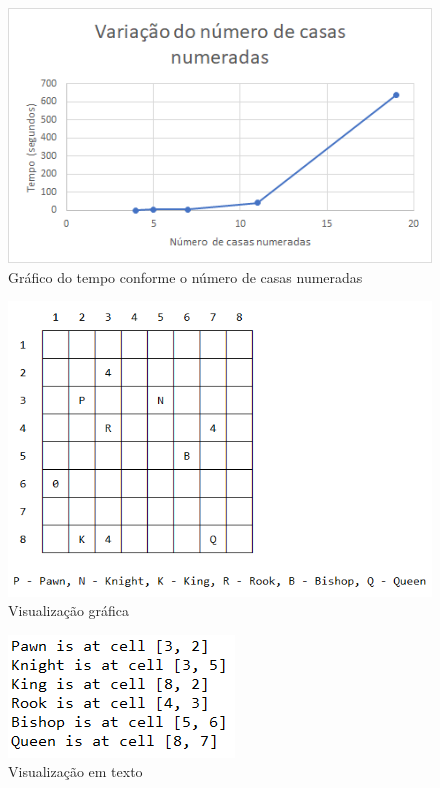 \documentclass[runningheads]{llncs}
\begin{document}
\begin{figure}
    \centering
    \includegraphics[scale=0.5]{./images/casasnumeradas.png}
    \caption{Gráfico do tempo conforme o número de casas numeradas} \label{fig2}
\end{figure}

\begin{figure}
    \centering
    \includegraphics[scale=0.5]{./images/solution.png}
    \caption{Visualização gráfica} \label{fig2}
\end{figure}

\begin{figure}
    \centering
    \includegraphics{./images/text.png}
    \caption{Visualização em texto} \label{fig2}
\end{figure}
\end{document}

